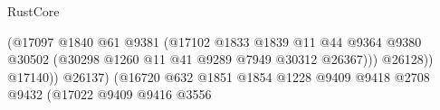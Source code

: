 \begin{lexlean}{RustCore}
\begin{coremodule}
                                                                    (@17097
                                                                      @1840
                                                                      @61
                                                                      @9381
                                                                      (@17102
                                                                        @1833
                                                                        @1839
                                                                        @11
                                                                        @44
                                                                        @9364
                                                                        @9380
                                                                        @30502
                                                                        (@30298
                                                                          @1260
                                                                          @11
                                                                          @41
                                                                          @9289
                                                                          @7949
                                                                          @30312
                                                                          @26367)))
                                                                    @26128))
                                                                @17140))
                                                            @26137)
                                                          (@16720
                                                            @632
                                                            @1851
                                                            @1854
                                                            @1228
                                                            @9409
                                                            @9418
                                                            @2708
                                                            @9432
                                                            (@17022
                                                              @9409
                                                              @9416
                                                              @3556

\end{coremodule}
\end{lexlean}
